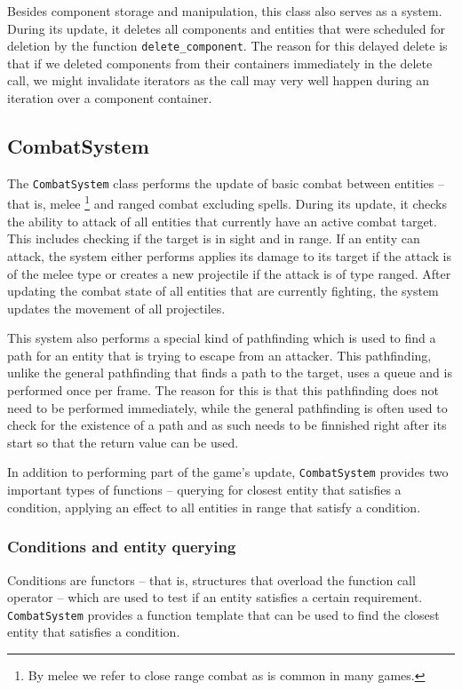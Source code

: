 Besides component storage and manipulation, this class also serves as a system. During its update, it deletes all components and entities
that were scheduled for deletion by the function \texttt{delete\_component}. The reason for this delayed delete is that if we deleted
components from their containers immediately in the delete call, we might invalidate iterators as the call may very well happen during
an iteration over a component container.

\subsection{CombatSystem}

The \texttt{CombatSystem} class performs the update of basic combat between entities -- that is, melee
\footnote{By melee we refer to close range combat as is common in many games.} and ranged combat excluding spells.
During its update, it checks the ability to attack of all entities that currently have an active combat target. This includes checking
if the target is in sight and in range. If an entity can attack, the system either performs applies its damage to its target if the
attack is of the melee type or creates a new projectile if the attack is of type ranged.
After updating the combat state of all entities that are currently fighting, the system updates the movement of all projectiles.

This system also performs a special kind of pathfinding which is used to find a path for an entity that is trying to escape from an attacker.
This pathfinding, unlike the general pathfinding that finds a path to the target, uses a queue and is performed once per frame. The reason for
this is that this pathfinding does not need to be performed immediately, while the general pathfinding is often used to check for the
existence of a path and as such needs to be finnished right after its start so that the return value can be used.

In addition to performing part of the game's update, \texttt{CombatSystem} provides two important types of functions -- querying for closest
entity that satisfies a condition, applying an effect to all entities in range that satisfy a condition.

\subsubsection{Conditions and entity querying}

Conditions are functors -- that is, structures that overload the function call operator -- which are used to test if an entity satisfies
a certain requirement. \texttt{CombatSystem} provides a function template that can be used to find the closest entity that satisfies
a condition.

